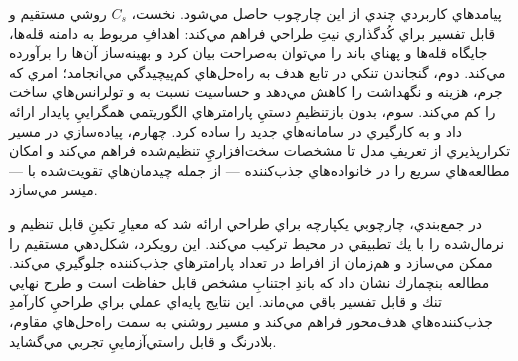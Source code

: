 \noindent پيامدهاي كاربردي چندي از اين چارچوب حاصل مي‌شود. نخست، \(C_s\) روشي مستقيم و قابل تفسير براي كُدگذاري نيتِ طراحي فراهم مي‌كند: اهدافِ مربوط به دامنه قله‌ها، جايگاه قله‌ها و پهناي باند را مي‌توان به‌صراحت بيان كرد و بهينه‌ساز آن‌ها را برآورده مي‌كند. دوم، گنجاندن تنكي در تابع هدف به راه‌حل‌هاي كم‌پيچيدگي مي‌انجامد؛ امري كه جرم، هزينه و نگهداشت را كاهش مي‌دهد و حساسيت نسبت به  و تولرانس‌هاي ساخت را كم مي‌كند. سوم،  بدون بازتنظيمِ دستيِ پارامترهاي الگوريتمي همگراييِ پايدار ارائه داد و به كارگيري در سامانه‌هاي جديد را ساده كرد. چهارم، پياده‌سازي در  مسير تكرارپذيري از تعريفِ مدل تا مشخصات سخت‌افزاريِ تنظيم‌شده فراهم مي‌كند و امكان مطالعه‌هاي  سريع را در خانواده‌هاي جذب‌كننده — از جمله چيدمان‌هاي تقويت‌شده با  — ميسر مي‌سازد.

\noindent در جمع‌بندي، چارچوبي يكپارچه براي طراحي  ارائه شد كه معيارِ تكينِ قابل تنظيم و نرمال‌شده را با يك  تطبيقي در محيط  تركيب مي‌كند. اين رويكرد، شكل‌دهي مستقيم  را ممكن مي‌سازد و هم‌زمان از افراط در تعداد پارامترهاي جذب‌كننده جلوگيري مي‌كند. مطالعه بنچمارك نشان داد كه باندِ اجتنابِ مشخص قابل حفاظت است و طرح نهايي تنك و قابل تفسير باقي مي‌ماند. اين نتايج پايه‌اي عملي براي طراحيِ كارآمدِ جذب‌كننده‌هاي هدف‌محور فراهم مي‌كند و مسير روشني به سمت راه‌حل‌هاي مقاوم، بلادرنگ و قابل راستي‌آزماييِ تجربي مي‌گشايد.





